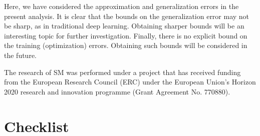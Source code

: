 \documentclass{article}
\numberwithin{equation}{section}
\newcommand{\1}{\mathbbm{1}}
\begin{document}
Here, we have considered the approximation and generalization errors in the present analysis. It is clear that the bounds on the generalization error may not be sharp, as in traditional deep learning. Obtaining sharper bounds will be an interesting topic for further investigation. Finally, there is no explicit bound on the training (optimization) errors. Obtaining such bounds will be considered in the future.



\begin{ack}
The research of SM was performed under a project that has received funding from the European Research Council (ERC) under the European Union’s Horizon 2020 research and innovation programme (Grant Agreement No. 770880). 
\end{ack}

%

{
\small

}
\section*{Checklist}
\end{document}
